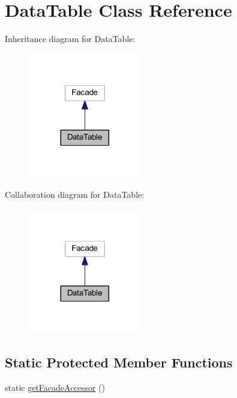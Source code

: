\hypertarget{classhamburgscleanest_1_1_data_tables_1_1_facades_1_1_data_table}{}\section{Data\+Table Class Reference}
\label{classhamburgscleanest_1_1_data_tables_1_1_facades_1_1_data_table}


Inheritance diagram for Data\+Table\+:\nopagebreak
\begin{figure}[H]
\begin{center}
\leavevmode
\includegraphics[width=140pt]{classhamburgscleanest_1_1_data_tables_1_1_facades_1_1_data_table__inherit__graph}
\end{center}
\end{figure}


Collaboration diagram for Data\+Table\+:\nopagebreak
\begin{figure}[H]
\begin{center}
\leavevmode
\includegraphics[width=140pt]{classhamburgscleanest_1_1_data_tables_1_1_facades_1_1_data_table__coll__graph}
\end{center}
\end{figure}
\subsection*{Static Protected Member Functions}
\begin{DoxyCompactItemize}
\item 
static \hyperlink{classhamburgscleanest_1_1_data_tables_1_1_facades_1_1_data_table_a19a808201f41f32f71a0532cb49b450f}{get\+Facade\+Accessor} ()
\end{DoxyCompactItemize}


